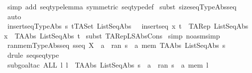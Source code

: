 \begin{isabellebody}
%
\isadelimproof
%
\endisadelimproof
%
\isatagproof
{}\isamarkupfalse%
\ {\isacharparenleft}simp\ add{\isacharcolon}\ seqtype{\isacharunderscore}lemma\ {\isacharbrackleft}symmetric{\isacharbrackright}\ seqtype{\isacharunderscore}def{\isacharparenright}\isanewline
{}\isamarkupfalse%
\ {\isacharparenleft}subst\ sizeseq{\isacharunderscore}TypeAbs{\isacharunderscore}seq{\isacharparenright}\ \isanewline
{}\isamarkupfalse%
\ auto\isanewline
{}\isamarkupfalse%
%
\endisatagproof
{\isafoldproof}%
%
\isadelimproof
\isanewline
%
\endisadelimproof
\isanewline
{}\isamarkupfalse%
\ insertseq{\isacharunderscore}TypeAbs{\isacharcolon}\ {\isachardoublequoteopen}{\isacharbang}{\isacharbang}s{\isachardot}\ t{\isacharcolon}TASet\ ListSeqAbs\ {\isacharequal}{\isacharequal}{\isachargreater}\ \ insertseq\ x\ t\ {\isacharequal}\ TARep\ ListSeqAbs\ {\isacharparenleft}x\ {\isacharhash}\ {\isacharparenleft}TAAbs\ ListSeqAbs\ t{\isacharparenright}{\isacharparenright}{\isachardoublequoteclose}\isanewline
%
\isadelimproof
%
\endisadelimproof
%
\isatagproof
{}\isamarkupfalse%
\ {\isacharparenleft}subst\ TARep{\isacharunderscore}LSAbs{\isacharunderscore}Cons{\isacharparenright}\isanewline
{}\isamarkupfalse%
\ {\isacharparenleft}simp\ {\isacharparenleft}no{\isacharunderscore}asm{\isacharunderscore}simp{\isacharparenright}{\isacharparenright}\isanewline
{}\isamarkupfalse%
%
\endisatagproof
{\isafoldproof}%
%
\isadelimproof
\isanewline
%
\endisadelimproof
\isanewline
\isanewline
{}\isamarkupfalse%
\ ran{\isacharunderscore}mem{\isacharunderscore}TypeAbs{\isacharunderscore}seq{\isacharcolon}\ {\isachardoublequoteopen}s{\isacharcolon}seq\ X\ {\isacharequal}{\isacharequal}{\isachargreater}\ a\ {\isacharcolon}\ {\isacharparenleft}ran\ s{\isacharparenright}\ {\isacharequal}\ {\isacharparenleft}a\ mem\ {\isacharparenleft}TAAbs\ ListSeqAbs\ s{\isacharparenright}{\isacharparenright}{\isachardoublequoteclose}\isanewline
%
\isadelimproof
%
\endisadelimproof
%
\isatagproof
{}\isamarkupfalse%
\ {\isacharparenleft}drule\ seq{\isacharunderscore}seqtype{\isacharparenright}\isanewline
{}\isamarkupfalse%
\ {\isacharparenleft}subgoal{\isacharunderscore}tac\ {\isachardoublequoteopen}ALL\ l{\isachardot}\ l\ {\isacharequal}\ {\isacharparenleft}TAAbs\ ListSeqAbs\ s{\isacharparenright}\ {\isacharminus}{\isacharminus}{\isachargreater}\ a\ {\isacharcolon}\ {\isacharparenleft}ran\ s{\isacharparenright}\ {\isacharequal}\ {\isacharparenleft}a\ mem\ l{\isacharparenright}\ {\isachardoublequoteclose}{\isacharparenright}\isanewline

\end{isabellebody}
